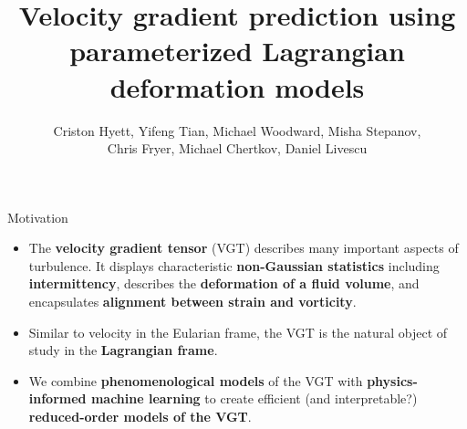 \graphicspath{{LearningTetradPaper/LagrangianDeformationModels/figs/}}
\title{Velocity gradient prediction using parameterized Lagrangian deformation models}

\author{Criston Hyett, Yifeng Tian, Michael Woodward, Misha Stepanov,\\ Chris Fryer, Michael Chertkov, Daniel Livescu}


\begin{frame}
  \maketitle
\end{frame}

\begin{frame}{Motivation}
  \begin{itemize}
  \item The \textbf{velocity gradient tensor} (VGT) describes many important aspects of turbulence. It displays characteristic \textbf{non-Gaussian statistics} including \textbf{intermittency}, describes the \textbf{deformation of a fluid volume}, and encapsulates \textbf{alignment between strain and vorticity}.

  \item Similar to velocity in the Eularian frame, the VGT is the natural object of study in the \textbf{Lagrangian frame}.

  \item We combine \textbf{phenomenological models} of the VGT with \textbf{physics-informed machine learning} to create efficient (and interpretable?) \textbf{reduced-order models of the VGT}.
  \end{itemize}
  
\end{frame}

